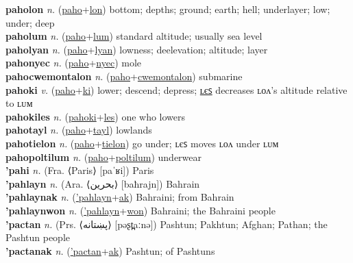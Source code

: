 \textbf{paholon} \textit{n.} (\hyperref[paho]{paho}+\hyperref[lon]{lon})
bottom; depths; ground; earth; hell; underlayer; low; under; deep \label{paholon} \\
\textbf{paholum} \textit{n.} (\hyperref[paho]{paho}+\hyperref[lum]{lum})
standard altitude; usually sea level \label{paholum} \\
\textbf{paholyan} \textit{n.} (\hyperref[paho]{paho}+\hyperref[lyan]{lyan})
lowness; deelevation; altitude; layer \label{paholyan} \\
\textbf{pahonyec} \textit{n.} (\hyperref[paho]{paho}+\hyperref[nyec]{nyec})
mole \label{pahonyec} \\
\textbf{pahocwemontalon} \textit{n.} (\hyperref[paho]{paho}+\hyperref[cwemontalon]{cwemontalon})
submarine \label{pahocwemontalon} \\
\textbf{pahoki} \textit{v.} (\hyperref[paho]{paho}+\hyperref[ki]{ki})
lower; descend; depress; \hyperref[pahokiles]{ʟєꜱ} decreases ʟᴏᴧ's altitude relative to ʟᴜᴍ \label{pahoki} \\
\textbf{pahokiles} \textit{n.} (\hyperref[pahoki]{pahoki}+\hyperref[les]{les})
one who lowers \label{pahokiles} \\
\textbf{pahotayl} \textit{n.} (\hyperref[paho]{paho}+\hyperref[tayl]{tayl})
lowlands \label{pahotayl} \\
\textbf{pahotielon} \textit{n.} (\hyperref[paho]{paho}+\hyperref[tielon]{tielon})
go under; ʟєꜱ moves ʟᴏᴧ under ʟᴜᴍ \label{pahotielon} \\
\textbf{pahopoltilum} \textit{n.} (\hyperref[paho]{paho}+\hyperref[poltilum]{poltilum})
underwear \label{pahopoltilum} \\
\textbf{'pahi} \textit{n.} (Fra. ⟨Paris⟩ [paˈʁi])
Paris \label{'pahi} \\
\textbf{'pahlayn} \textit{n.} (Ara. ⟨بحرين‎⟩ [baħrajn])
Bahrain \label{'pahlayn} \\
\textbf{'pahlaynak} \textit{n.} (\hyperref['pahlayn]{'pahlayn}+\hyperref[ak]{ak})
Bahraini; from Bahrain \label{'pahlaynak} \\
\textbf{'pahlaynwon} \textit{n.} (\hyperref['pahlayn]{'pahlayn}+\hyperref[won]{won})
Bahraini; the Bahraini people \label{'pahlaynwon} \\
\textbf{'pactan} \textit{n.} (Prs. ⟨پښتانه‎‎⟩ [pəʂt̪aːnə])
Pashtun; Pakhtun; Afghan; Pathan; the Pashtun people \label{'pactan} \\
\textbf{'pactanak} \textit{n.} (\hyperref['pactan]{'pactan}+\hyperref[ak]{ak})
Pashtun; of Pashtuns \label{'pactanak} \\
